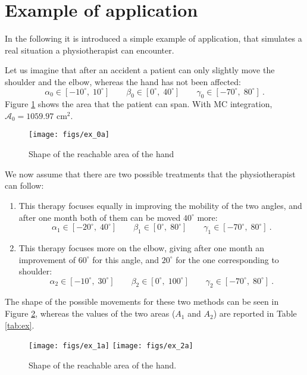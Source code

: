 \section{Example of application}
In the following it is introduced a simple example of application, that simulates a real situation a physiotherapist can encounter. 

Let us imagine that after an accident a patient can only slightly move the shoulder and the elbow, whereas the hand has not been affected:
$$
\alpha_0\in [-10^\circ, \; 10^\circ] \qquad \beta_0\in [0^\circ, \; 40^\circ] \qquad \gamma_0\in [-70^\circ, \; 80^\circ] \ .
$$
Figure \ref{fig:ex0a} shows the area that the patient can span. With MC integration, $\mathcal{A}_0=1059.97$ cm$^2$.
\begin{figure}[!ht]
  \centering
  \texttt{[image: figs/ex\_0a]}
\caption{Shape of the reachable area of the hand}
\label{fig:ex0a}
\end{figure}


We now assume that there are two possible treatments that the physiotherapist can follow:
\begin{enumerate}
\item This therapy focuses equally in improving the mobility of the two angles, and after one month both of them can be moved $40^\circ$ more:
$$
\alpha_1\in [-20^\circ, \; 40^\circ] \qquad \beta_1\in [0^\circ, \; 80^\circ] \qquad \gamma_1\in [-70^\circ, \; 80^\circ] \ .
$$

\item This therapy focuses more on the elbow, giving after one month an improvement of $60^\circ$ for this angle, and $20^\circ$ for the one corresponding to shoulder:
$$
\alpha_2\in [-10^\circ, \; 30^\circ] \qquad \beta_2\in [0^\circ, \; 100^\circ] \qquad \gamma_2\in [-70^\circ, \; 80^\circ] \ .
$$
\end{enumerate}

The shape of the possible movements for these two methods can be seen in Figure \ref{fig:ex1a}, whereas the values of the two areas ($A_1$ and $A_2$) are reported in Table \ref{tab:ex}.

\begin{figure}[!ht]
  \centering
  \texttt{[image: figs/ex\_1a]}
  \hfill
  \texttt{[image: figs/ex\_2a]}
\caption{Shape of the reachable area of the hand.}
\label{fig:ex1a}
\end{figure}

